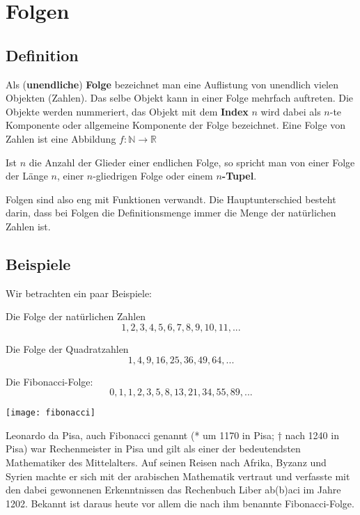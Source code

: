 
\chapter{Folgen}
\section{Definition} %
\begin{definition}
Als (\textbf{unendliche}) \textbf{Folge} bezeichnet man eine Auflistung von unendlich vielen Objekten (Zahlen). Das selbe Objekt kann in einer Folge mehrfach auftreten. Die Objekte werden nummeriert, das Objekt mit dem \textbf{Index} $n$ wird dabei als $n$-te Komponente oder allgemeine Komponente der Folge bezeichnet. Eine Folge von Zahlen ist eine Abbildung $f: \mathbb{N} \rightarrow \mathbb{R}$ 

Ist $n$ die Anzahl der Glieder einer endlichen Folge, so spricht man von einer Folge der Länge $n$, einer $n$-gliedrigen Folge oder einem \textbf{$n$-Tupel}.
\end{definition}

Folgen sind also eng mit Funktionen verwandt. Die Hauptunterschied besteht darin, dass bei Folgen die Definitionsmenge immer die Menge der natürlichen Zahlen ist.
\section{Beispiele}
Wir betrachten ein paar Beispiele:
\begin{example}
Die Folge der natürlichen Zahlen
\[ 1,2,3,4,5,6,7,8,9,10,11,...\]
\end{example}

\begin{example}
Die Folge der Quadratzahlen
\[ 1,4,9,16,25,36,49,64,...\]
\end{example}

\begin{example}
Die Fibonacci-Folge:
\[ 0,1,1,2,3,5,8,13,21,34,55,89,...\]
\end{example}
\begin{marginfigure}
    \texttt{[image: fibonacci]}
    \caption{Leonardo da Pisa, auch Fibonacci genannt (* um 1170 in Pisa; † nach 1240 in Pisa) war Rechenmeister in Pisa und gilt als einer der bedeutendsten Mathematiker des Mittelalters. Auf seinen Reisen nach Afrika, Byzanz und Syrien machte er sich mit der arabischen Mathematik vertraut und verfasste mit den dabei gewonnenen Erkenntnissen das Rechenbuch Liber ab(b)aci im Jahre 1202. Bekannt ist daraus heute vor allem die nach ihm benannte Fibonacci-Folge.} 
\end{marginfigure}

